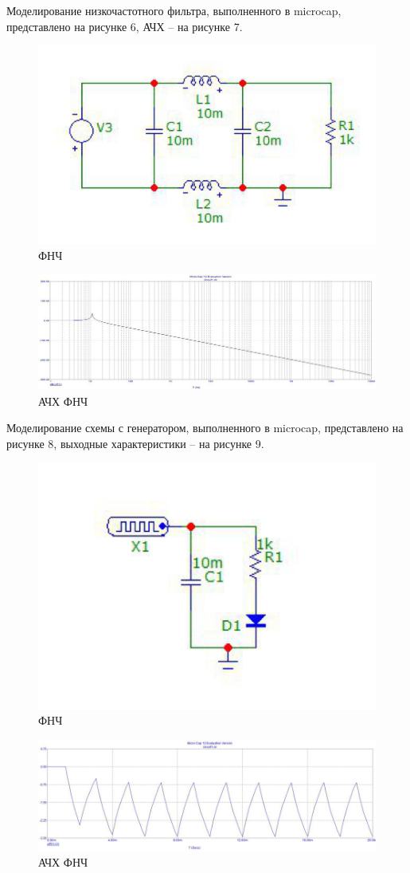 Моделирование низкочастотного фильтра, выполненного в microcap, представлено на рисунке 6, АЧХ – на рисунке 7.  

\begin{figure}[H]
	\centering
	\includegraphics[width=0.7\linewidth]{img/f6}
	\caption{ФНЧ}
\end{figure}

\begin{figure}[H]
	\centering
	\includegraphics[width=0.7\linewidth]{img/f7}
	\caption{АЧХ ФНЧ}
\end{figure}

Моделирование схемы с генератором, выполненного в microcap, представлено на рисунке 8, выходные характеристики – на рисунке 9.  

\begin{figure}[H]
	\centering
	\includegraphics[width=0.7\linewidth]{img/f8}
	\caption{ФНЧ}
\end{figure}

\begin{figure}[H]
	\centering
	\includegraphics[width=0.7\linewidth]{img/f9}
	\caption{АЧХ ФНЧ}
\end{figure}

